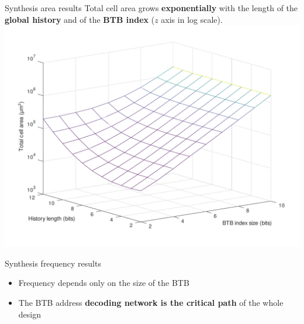 \documentclass{beamer}
\begin{document}
\begin{frame}{Synthesis area results}
  Total cell area grows \textbf{exponentially} with the length of the \textbf{global history} and of the \textbf{BTB index} ($z$ axis in log scale).
  \includegraphics[scale=.5]{img/bpu_area.pdf}
\end{frame}

\begin{frame}{Synthesis frequency results}
  \begin{figure}
    \centering
  \end{figure}

  \begin{itemize}
    \item Frequency depends only on the size of the BTB
    \item The BTB address \textbf{decoding network is the critical path} of the whole design
  \end{itemize}
\end{frame}
\end{document}
